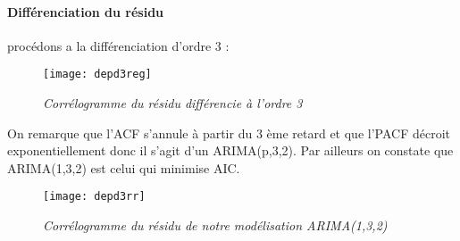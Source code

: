             \paragraph{Différenciation du résidu} procédons a la différenciation
            d'ordre 3 :
            \begin{figure}[H]
                \centering 
                \label{fig:depd3reg} 
                \texttt{[image: depd3reg]} 
                \caption{\it Corrélogramme du résidu différencie à l'ordre 3 } 
            \end{figure} 
            On remarque que l'ACF s'annule à partir du 3 ème retard et que
            l'PACF décroit exponentiellement donc il s'agit d'un ARIMA(p,3,2).
            Par ailleurs on constate que ARIMA(1,3,2) est celui qui minimise
            AIC.
            
            \begin{figure}[H]
                \centering 
                \label{fig:depd3rr} 
                \texttt{[image: depd3rr]} 
                \caption{\it Corrélogramme du résidu de notre modélisation ARIMA(1,3,2) } 
            \end{figure} 

